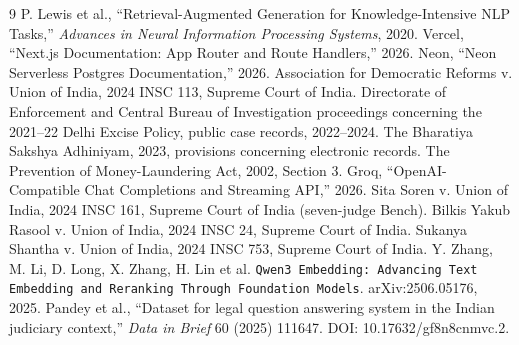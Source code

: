 \documentclass[12pt]{article}
\begin{document}
\begin{thebibliography}{9}
 P. Lewis et al., ``Retrieval-Augmented Generation for Knowledge-Intensive NLP Tasks,'' \emph{Advances in Neural Information Processing Systems}, 2020.
 Vercel, ``Next.js Documentation: App Router and Route Handlers,'' 2026.
 Neon, ``Neon Serverless Postgres Documentation,'' 2026.
 Association for Democratic Reforms v. Union of India, 2024 INSC 113, Supreme Court of India.
 Directorate of Enforcement and Central Bureau of Investigation proceedings concerning the 2021--22 Delhi Excise Policy, public case records, 2022--2024.
 The Bharatiya Sakshya Adhiniyam, 2023, provisions concerning electronic records.
 The Prevention of Money-Laundering Act, 2002, Section 3.
 Groq, ``OpenAI-Compatible Chat Completions and Streaming API,'' 2026.
 Sita Soren v. Union of India, 2024 INSC 161, Supreme Court of India (seven-judge Bench).
 Bilkis Yakub Rasool v. Union of India, 2024 INSC 24, Supreme Court of India.
 Sukanya Shantha v. Union of India, 2024 INSC 753, Supreme Court of India.
 Y. Zhang, M. Li, D. Long, X. Zhang, H. Lin et al. \texttt{Qwen3 Embedding: Advancing Text Embedding and Reranking Through Foundation Models}. arXiv:2506.05176, 2025.
 Pandey et al., ``Dataset for legal question answering system in the Indian judiciary context,'' \emph{Data in Brief} 60 (2025) 111647. DOI: 10.17632/gf8n8cnmvc.2.
\end{thebibliography}
\end{document}
